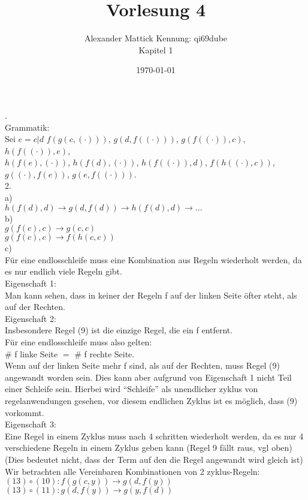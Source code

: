 \documentclass{article}
\author{
Alexander Mattick Kennung: qi69dube\\
Kapitel 1
}
\date{\today}
\title{Vorlesung 4}
\begin{document}
	.\\
	Grammatik:\\
	Sei $e=c|d$
	$f(g(c,(\cdot)))$, $g(d,f((\cdot)))$, $g(f((\cdot)),c)$, $h(f((\cdot)),e)$,\\
	$h(f(e),(\cdot))$, $h(f(d),(\cdot))$, $h(f((\cdot)), d)$, $f(h((\cdot),c))$, $g((\cdot), f(e))$,
	$g(e, f((\cdot)))$.\\
	2.\\
	a)\\
	$h(f(d),d)\to g(d,f(d))\to h(f(d),d)\to\dots $\\
	b)\\
	$g(f(c),c)\to g(c,c)$\\
	$g(f(c),c)\to f(h(c,c))$\\
	c)\\
	Für eine endlosschleife muss eine Kombination aus Regeln wiederholt werden, da es nur endlich viele Regeln gibt.\\
	Eigenschaft 1:\\
	Man kann sehen, dass in keiner der Regeln f auf der linken Seite öfter steht, als auf der Rechten. \\
	Eigenschaft 2:\\
	Insbesondere Regel (9) ist die einzige Regel, die ein f entfernt.\\
	Für eine endlosschleife muss also gelten:\\
	\# f linke Seite $=$ \# f rechte Seite.\\
	Wenn auf der linken Seite mehr f sind, als auf der Rechten, muss Regel (9) angewandt worden sein. Dies kann aber aufgrund von Eigenschaft 1 nicht Teil einer Schleife sein. Hierbei wird ``Schleife'' als unendlicher zyklus von regelanwendungen gesehen, vor diesem endlichen Zyklus ist es möglich, dass (9) vorkommt.\\
	Eigenschaft 3:\\
	Eine Regel in einem Zyklus muss nach 4 schritten wiederholt werden, da es nur 4 verschiedene Regeln in einem Zyklus geben kann (Regel 9 fällt raus, vgl oben)\\
	(Dies bedeutet nicht, dass der Term auf den die Regel angewandt wird gleich ist)\\
	Wir betrachten alle Vereinbaren Kombinationen von 2 zyklus-Regeln:\\
	$(13)\circ (10): f(g(c,y))\to g(d,f(y))$\\
	$(13)\circ (11): g(d,f(y))\to g(y,f(d))$\\
\end{document}
